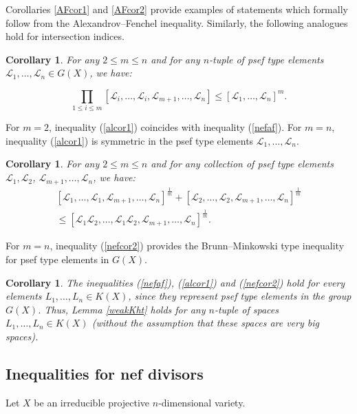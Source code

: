 \documentclass[11pt]{article}
\theoremstyle{plain}
\newtheorem{corollary}[theorem]{Corollary}
\theoremstyle{definition}
\begin{document}
Corollaries \ref{AFcor1} and \ref{AFcor2} provide examples of statements which formally follow from the Alexandrov--Fenchel inequality. Similarly, the following analogues hold for intersection indices.

\begin{corollary} For any $2\leq m\leq n$ and for any   $n$-tuple of  psef type elements  $\mathcal L_1,\dots, \mathcal L_n \in G(X)$, we have:

\begin{equation}\label{alcor1}
 \prod_{1\leq i\leq m} [\mathcal L_i,\dots,\mathcal L_i, \mathcal L_{m+1}, \dots, \mathcal L_n]\leq [\mathcal L_1,\dots,\mathcal L_n]^m.
 \end{equation}
\end{corollary}

For $m=2$, inequality (\ref{alcor1}) coincides with inequality (\ref{nefaf}). For $m=n$, inequality (\ref{alcor1}) is symmetric in the psef type elements  $\mathcal L_1,\dots,\mathcal L_n$.

\begin{corollary}  For any $2\leq m\leq n$ and for any collection of psef type elements  $\mathcal L_1, \mathcal L_2$, $\mathcal L_{m+1},\dots,\mathcal L_n$, we have:
\begin{equation}\label{nefcor2}\begin{aligned}
[\mathcal L_1,\dots,\mathcal L_1,\mathcal L_{m+1},\dots,\mathcal L_n]^{\frac{1}{m}}+ [\mathcal L_2,\dots,\mathcal L_2,\mathcal L_{m+1},\dots,\mathcal L_n]^{\frac{1}{m}}\\
\leq  [\mathcal L_1\mathcal L_2,\dots,\mathcal L_1\mathcal L_2,\mathcal L_{m+1},\dots,\mathcal L_n]^{\frac{1}{m}}.\end{aligned}
\end{equation}
\end{corollary}

For $m=n$, inequality (\ref{nefcor2})
provides the  Brunn--Minkowski  type inequality for psef type  elements in $G(X)$.


\begin{corollary}\label{algAF} The inequalities (\ref{nefaf}), (\ref{alcor1}) and (\ref{nefcor2}) hold for every elements $L_1,\dots, L_n\in K(X)$,
since they represent psef type elements in the group $G(X)$. Thus, Lemma \ref{weakKht} holds for any $n$-tuple of spaces $L_1,\dots, L_n\in K(X)$ (without the  assumption that these spaces  are very big spaces).
\end{corollary}

\subsection{Inequalities for nef  divisors}
Let $X$ be an irreducible  projective  $n$-dimensional variety.
\end{document}
